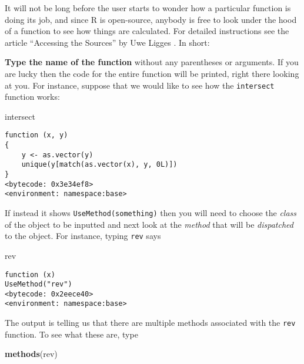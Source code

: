 \documentclass[]{book}
\newenvironment{Shaded}{\begin{snugshade}}{\end{snugshade}}
\newcommand{\KeywordTok}[1]{\textcolor[rgb]{0.13,0.29,0.53}{\textbf{{#1}}}}
\newcommand{\NormalTok}[1]{{#1}}
\numberwithin{equation}{chapter}
\numberwithin{figure}{chapter}
\theoremstyle{plain}
\theoremstyle{definition}
\theoremstyle{remark}
\theoremstyle{definition}
\theoremstyle{definition}
\theoremstyle{remark}
\begin{document}
It will not be long before the user starts to wonder how a particular
function is doing its job, and since R is open-source, anybody is free
to look under the hood of a function to see how things are calculated.
For detailed instructions see the article ``Accessing the Sources'' by
Uwe Ligges \autocite{Ligges2006}. In short:

\textbf{Type the name of the function} without any parentheses or
arguments. If you are lucky then the code for the entire function will
be printed, right there looking at you. For instance, suppose that we
would like to see how the \texttt{intersect}
 function works:

\begin{Shaded}
\begin{Highlighting}[]
\NormalTok{intersect}
\end{Highlighting}
\end{Shaded}

\begin{verbatim}
function (x, y) 
{
    y <- as.vector(y)
    unique(y[match(as.vector(x), y, 0L)])
}
<bytecode: 0x3e34ef8>
<environment: namespace:base>
\end{verbatim}

If instead it shows \texttt{UseMethod(something)}
 then you will need to choose the
\emph{class} of the object to be inputted and next look at the
\emph{method} that will be \emph{dispatched} to the object. For
instance, typing \texttt{rev}  says

\begin{Shaded}
\begin{Highlighting}[]
\NormalTok{rev}
\end{Highlighting}
\end{Shaded}

\begin{verbatim}
function (x) 
UseMethod("rev")
<bytecode: 0x2eece40>
<environment: namespace:base>
\end{verbatim}

The output is telling us that there are multiple methods associated with
the \texttt{rev} function. To see what these are, type

\begin{Shaded}
\begin{Highlighting}[]
\KeywordTok{methods}\NormalTok{(rev)}
\end{Highlighting}
\end{Shaded}
\end{document}
